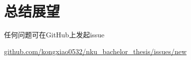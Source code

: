 \chapter{总结展望}

任何问题可在GitHub上发起issue 

\href{https://github.com/kongxiao0532/nku\_bachelor\_thesis/issues/new}{github.com/kongxiao0532/nku\_bachelor\_thesis/issues/new}